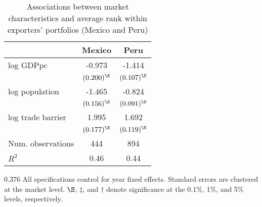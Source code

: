 \begin{table}[h!]
\footnotesize
\begin{center}
\caption{Associations between market characteristics and average rank within exporters' portfolios (Mexico and Peru)}
\label{tab:regs_wbedd}
\begin{tabular}{lcc}\toprule
& Mexico & Peru\\
\midrule
log GDPpc& -0.973 & -1.414\\
& $(0.200)^\S$& $(0.107)^\S$\\[4pt]
log population& -1.465 & -0.824\\
& $(0.156)^\S$& $(0.091)^\S$\\[4pt]
log trade barrier& 1.995 & 1.692\\
& $(0.177)^\S$& $(0.119)^\S$\\[4pt]
Num. observations& 444 & 894\\
$R^2$& 0.46& 0.44\\
\bottomrule
\end{tabular}
\vspace{-0.1cm}
\begin{fignote2}{0.376\textwidth}
All specifications control for year fixed effects. Standard errors are clustered at the market level. $\S$, $\ddagger$, and $\dagger$ denote significance at the 0.1\%, 1\%, and 5\% levels, respectively.
\end{fignote2}
\end{center}
\normalsize
\end{table}
